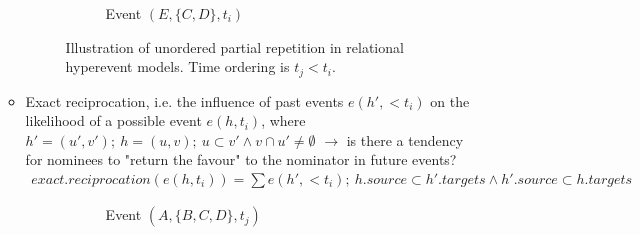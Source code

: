 \begin{itemize}
\begin{itemize}
\begin{figure}
\begin{mdframed}
\begin{subfigure}[t]{0.45\linewidth}
					\caption{Event $(E,\{C,D\},t_i)$}
				\end{subfigure}
				\caption{Illustration of unordered partial repetition in relational hyperevent models. Time ordering is $t_j < t_i$.}
				\label{fig:rhem_unordered_partial_repetition}
			\end{mdframed}
		\end{figure}
	
		\item Exact reciprocation, i.e. the influence of past events $e(h',<t_i)$ on the likelihood of a possible event $e(h,t_i)$, where $h' = (u',v'); \: h = (u,v); \: u \subset v' \land v \cap u' \neq \emptyset$ $\rightarrow$ is there a tendency for nominees to "return the favour" to the nominator in future events?
		\begin{align*}
			exact.reciprocation(e(h,t_i)) = \sum e(h',<t_i); \: h.source \subset h'.targets \land h'.source \subset h.targets
		\end{align*}
		\begin{figure}
			\begin{mdframed}
				\centering
				\begin{subfigure}[t]{0.45\linewidth}
					\vskip 0pt
					\caption{Event $(A,\{B,C,D\},t_j)$}
				\end{subfigure}
				\hfill
				\begin{subfigure}[t]{0.45\linewidth}
					\vskip 0pt
\end{subfigure}
\end{mdframed}
\end{figure}
\end{itemize}
\end{itemize}
